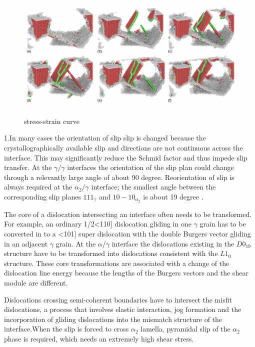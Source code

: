 \documentclass[journal,article,submit,moreauthors,pdftex,10pt,a4paper]{Definitions/mdpi}
\begin{document}
	\begin{figure}[h]
		\centering
		\includegraphics[width=1\linewidth]{img/disl2-gamma}
		\label{fig:surf}
		\caption{stress-strain curve}
	\end{figure}
1.In many cases the orientation of slip slip is changed because the crystallographically available slip and directions are not continuous across the interface. This may significantly reduce the Schmid factor and thus impede slip transfer. At the $\gamma/\gamma$ interfaces the orientation of the slip plan could change through a relevantly large angle of about 90 degree. Reorientation of slip is always required at the $\alpha_{2}/\gamma$ interface; the smallest angle between the corresponding slip planes ${1 1 1 }_{\gamma}$ and ${ 1 0 -1 0}_{\alpha_2}$ is about 19 degree \cite{}.
	
The core of  a dislocation intersecting an interface often needs to be transformed. For example, an ordinary 1/2<110] dislocation gliding in one $\gamma$ grain has to be converted in to a <101] super dislocation with the double Burgers vector gliding in an adjacent $\gamma$ grain. At the $\alpha/\gamma$ interface the dislocations existing in the $D0_{19}$ structure have to be transformed into dislocations consistent with the $L1_0$structure. These core transformations are associated with a change of the dislocation line energy because the lengths of the Burgers vectors and the shear module are different.
	
Dislocations crossing semi-coherent boundaries have to intersect the misfit dislocations, a process that involves elastic interaction, jog formation and the incorporation of gliding dislocations into the mismatch structure of the interface.When the slip is forced to cross $\alpha_2$ lamella, pyramidal slip of the $\alpha_2$ phase is required, which needs an extremely high shear stress.
	
	
	
\end{document}
